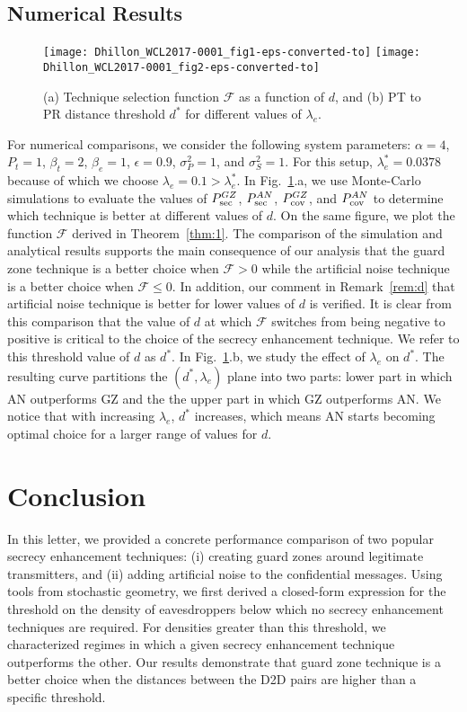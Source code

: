 \documentclass[final]{IEEEtran}
\begin{document}
\subsection{Numerical Results} 
\vspace{-1mm}
\begin{figure}
\centering
\texttt{[image: Dhillon\_WCL2017-0001\_fig1-eps-converted-to]}
\hfill
\texttt{[image: Dhillon\_WCL2017-0001\_fig2-eps-converted-to]}
\caption{(a) Technique selection function $\mathcal{F}$ as a function of $d$, and (b) PT to PR distance threshold $d^*$ for different values of $\lambda_e$.}
\label{fig:1}
\vspace{-5mm}
\end{figure}
For numerical comparisons, we consider the following system parameters: $\alpha=4$, $P_t=1$, $\beta_t=2$, $\beta_e=1$, $\epsilon=0.9$, $\sigma_P^2=1$, and $\sigma_S^2=1$. For this setup, $\lambda_e^* = 0.0378$ because of which we choose $\lambda_e = 0.1 > \lambda_e^*$. In Fig.~\ref{fig:1}.a, we use Monte-Carlo simulations to evaluate the values of $P_{\rm sec}^{GZ}$, $P_{\rm sec}^{AN}$, $P_{\rm cov}^{GZ}$, and $P_{\rm cov}^{AN}$ to determine which technique is better at different values of $d$. On the same figure, we plot the function $\mathcal{F}$ derived in Theorem~\ref{thm:1}. The comparison of the simulation and analytical results supports the main consequence of our analysis that the guard zone technique is a better choice when $\mathcal{F}> 0$ while the artificial noise technique is a better choice when $\mathcal{F}\leq 0$. In addition, our comment in Remark~\ref{rem:d} that artificial noise technique is better for lower values of $d$ is verified. It is clear from this comparison that the value of $d$ at which $\mathcal{F}$ switches from being negative to positive is critical to the choice of the secrecy enhancement technique. We refer to this threshold value of $d$ as $d^*$. In Fig.~\ref{fig:1}.b, we study the effect of $\lambda_e$ on $d^*$. The resulting curve partitions the $(d^*, \lambda_e)$ plane into two parts: lower part in which AN outperforms GZ and the the upper part in which GZ outperforms AN. We notice that with increasing $\lambda_e$, $d^*$ increases, which means AN starts becoming optimal choice for a larger range of values for $d$. 
\vspace{-4mm}
\section{Conclusion}
\vspace{-2mm}
In this letter, we provided a concrete performance comparison of two popular secrecy enhancement techniques: (i) creating guard zones around legitimate transmitters, and (ii) adding artificial noise to the confidential messages. Using tools from stochastic geometry, we first derived a closed-form expression for the threshold on the density of eavesdroppers below which no secrecy enhancement techniques are required. For densities greater than this threshold, we characterized regimes in which a given secrecy enhancement technique outperforms the other. Our results demonstrate that guard zone technique is a better choice when the distances between the D2D pairs are higher than a specific threshold. 
\end{document}

